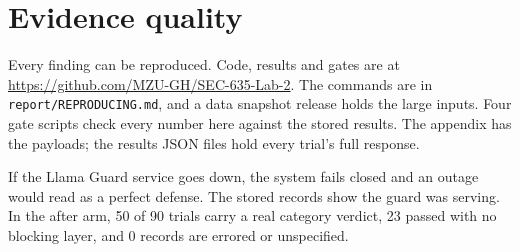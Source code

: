 \section{Evidence quality}

Every finding can be reproduced. Code, results and gates are at \url{https://github.com/MZU-GH/SEC-635-Lab-2}. The commands are in \texttt{report/REPRODUCING.md}, and a data snapshot release holds the large inputs. Four gate scripts check every number here against the stored results. The appendix has the payloads; the results JSON files hold every trial's full response.

 If the Llama Guard service goes down, the system fails closed and an outage would read as a perfect defense. The stored records show the guard was serving. In the after arm, 50 of 90 trials carry a real category verdict, 23 passed with no blocking layer, and 0 records are errored or unspecified.

